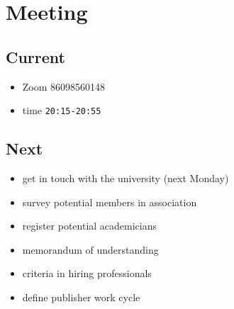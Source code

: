 \documentclass{beamer}
\begin{document}
\section{Meeting}

\subsection{Current}
\begin{frame}
  \begin{itemize}
    \item Zoom 86098560148
    \item time {\tt 20:15-20:55}
  \end{itemize}
\end{frame}


\subsection{Next}
\begin{frame}
  \begin{itemize}
    \item get in touch with the university (next Monday)
    \item survey potential members in association
    \item register potential academicians
    \item memorandum of understanding
    \item criteria in hiring professionals
    \item define publisher work cycle
  \end{itemize}
\end{frame}
\end{document}
